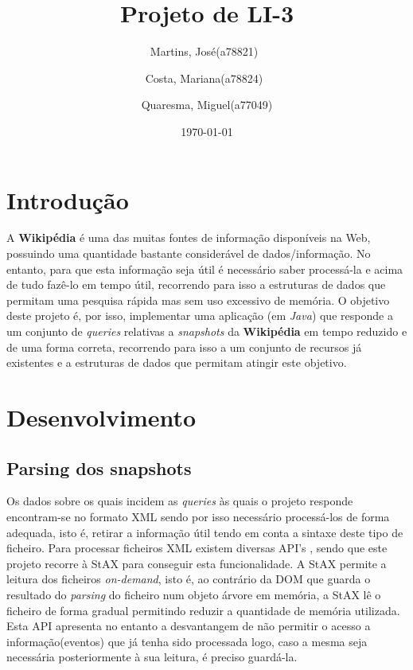 \documentclass[a4paper,11pt]{article}
\title{Projeto de LI-3}
\author{Martins, José(a78821)\
        \and
        Costa, Mariana(a78824)\
        \and
        Quaresma, Miguel(a77049)
        }
\date{\today}
\begin{document}
\begin{titlepage}
\maketitle
\end{titlepage}

\tableofcontents
\newpage

\section{Introdução}
A \textbf{Wikipédia} é uma  das muitas fontes de informação disponíveis na Web, possuindo uma quantidade bastante considerável de dados/informação.
No entanto, para que esta informação seja útil é necessário saber processá-la e acima de tudo fazê-lo em tempo útil, recorrendo para isso a estruturas de dados que permitam uma pesquisa rápida mas sem uso excessivo de memória. O objetivo deste projeto é, por isso, implementar uma aplicação (em \textit{Java}) que responde a um conjunto de \textit{queries} relativas a \textit{snapshots} da \textbf{Wikipédia} em tempo reduzido e de uma forma correta, recorrendo para isso a um conjunto de recursos já existentes e a estruturas de dados que permitam atingir este objetivo.

\newpage

\section{Desenvolvimento}

\subsection{Parsing dos snapshots}
Os dados sobre os quais incidem as \textit{queries} às quais o projeto responde encontram-se no formato XML sendo por isso necessário processá-los de forma adequada, isto é, retirar a informação útil tendo em conta a sintaxe deste tipo de ficheiro. Para processar ficheiros XML existem diversas API's , sendo que este projeto recorre à StAX para conseguir esta funcionalidade. A StAX permite a leitura dos ficheiros \textit{on-demand}, isto é, ao contrário da DOM que guarda o resultado do \textit{parsing} do ficheiro num objeto árvore em memória, a StAX lê o ficheiro de forma gradual permitindo reduzir a quantidade de memória utilizada. Esta API apresenta no entanto a desvantangem de não permitir o acesso a informação(eventos) que já tenha sido processada logo, caso a mesma seja necessária posteriormente à sua leitura, é preciso guardá-la.
\end{document}
